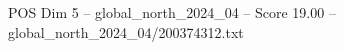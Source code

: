 \begin{textsample}{POS Dim 5 – global\_north\_2024\_04 – Score 19.00 – global\_north\_2024\_04/200374312.txt}
\end{textsample}
